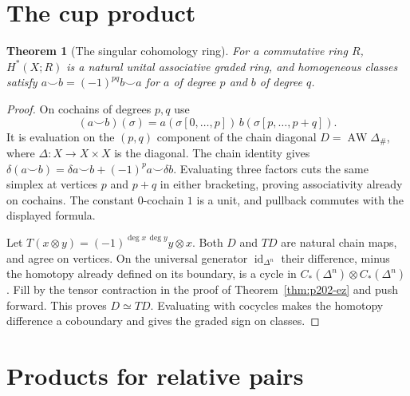 \documentclass[11pt,oneside,openany]{book}
\theoremstyle{plain}
\newtheorem{theorem}{Theorem}[chapter]
\theoremstyle{definition}
\theoremstyle{remark}
\begin{document}
\section{The cup product}\label{p202:T24}

\begin{theorem}[The singular cohomology ring]\label{thm:p202-cup}
For a commutative ring \(R\), \(H^*(X;R)\) is a natural
unital associative graded ring, and homogeneous classes
satisfy \(a\smile b=(-1)^{pq}b\smile a\) for
\(a\) of degree \(p\) and \(b\) of degree \(q\).
\end{theorem}
\begin{proof}
On cochains of degrees \(p,q\) use
\[
 (a\smile b)(\sigma)=
 a(\sigma[0,\ldots,p])\,b(\sigma[p,\ldots,p+q]).
\]
It is evaluation on the \((p,q)\) component of the chain
diagonal \(D=\operatorname{AW}\Delta_\#\), where
\(\Delta:X\to X\times X\) is the diagonal. The chain
identity gives
\(\delta(a\smile b)=\delta a\smile b+(-1)^p a\smile\delta b\).
Evaluating three factors cuts the same simplex at vertices
\(p\) and \(p+q\) in either bracketing, proving associativity
already on cochains. The constant \(0\)-cochain \(1\) is a
unit, and pullback commutes with the displayed formula.

Let \(T(x\otimes y)=(-1)^{\deg x\,\deg y}y\otimes x\).
Both \(D\) and \(TD\) are natural chain maps, and agree on
vertices. On the universal generator \(\operatorname{id}_{\Delta^n}\)
their difference, minus the homotopy already defined on its
boundary, is a cycle in \(C_*(\Delta^n)\otimes C_*(\Delta^n)\).
Fill by the tensor contraction in the proof of
Theorem~\ref{thm:p202-ez} and push forward. This proves
\(D\simeq TD\). Evaluating with cocycles makes the
homotopy difference a coboundary and gives the graded sign
on classes.
\end{proof}

\section{Products for relative pairs}\label{p202:T25}
\end{document}
